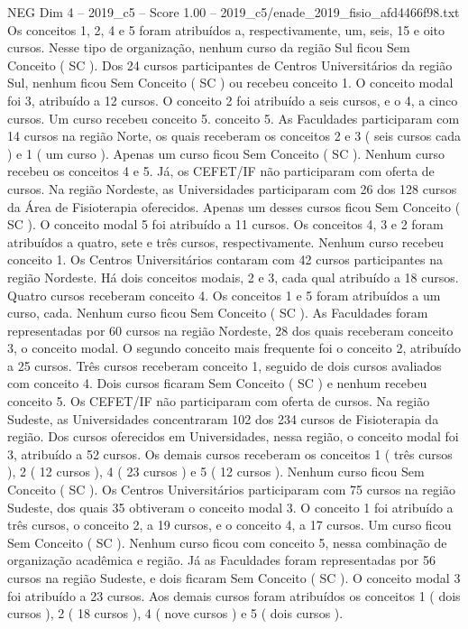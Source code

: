 \begin{textsample}{NEG Dim 4 – 2019\_c5 – Score 1.00 – 2019\_c5/enade\_2019\_fisio\_afd4466f98.txt}
Os conceitos 1, 2, 4 e 5 foram atribuídos a, respectivamente, um, seis, 15 e oito cursos.
Nesse tipo de organização, nenhum curso da região Sul ficou Sem Conceito ( SC ).
Dos 24 cursos participantes de Centros Universitários da região Sul, nenhum ficou Sem Conceito ( SC ) ou recebeu conceito 1.
O conceito modal foi 3, atribuído a 12 cursos.
O conceito 2 foi atribuído a seis cursos, e o 4, a cinco cursos.
Um curso recebeu conceito 5. conceito 5.
As Faculdades participaram com 14 cursos na região Norte, os quais receberam os conceitos 2 e 3 ( seis cursos cada ) e 1 ( um curso ).
Apenas um curso ficou Sem Conceito ( SC ).
Nenhum curso recebeu os conceitos 4 e 5.
Já, os CEFET/IF não participaram com oferta de cursos.
Na região Nordeste, as Universidades participaram com 26 dos 128 cursos da Área de Fisioterapia oferecidos.
Apenas um desses cursos ficou Sem Conceito ( SC ).
O conceito modal 5 foi atribuído a 11 cursos.
Os conceitos 4, 3 e 2 foram atribuídos a quatro, sete e três cursos, respectivamente.
Nenhum curso recebeu conceito 1.
Os Centros Universitários contaram com 42 cursos participantes na região Nordeste.
Há dois conceitos modais, 2 e 3, cada qual atribuído a 18 cursos.
Quatro cursos receberam conceito 4.
Os conceitos 1 e 5 foram atribuídos a um curso, cada.
Nenhum curso ficou Sem Conceito ( SC ).
As Faculdades foram representadas por 60 cursos na região Nordeste, 28 dos quais receberam conceito 3, o conceito modal.
O segundo conceito mais frequente foi o conceito 2, atribuído a 25 cursos.
Três cursos receberam conceito 1, seguido de dois cursos avaliados com conceito 4.
Dois cursos ficaram Sem Conceito ( SC ) e nenhum recebeu conceito 5.
Os CEFET/IF não participaram com oferta de cursos.
Na região Sudeste, as Universidades concentraram 102 dos 234 cursos de Fisioterapia da região.
Dos cursos oferecidos em Universidades, nessa região, o conceito modal foi 3, atribuído a 52 cursos.
Os demais cursos receberam os conceitos 1 ( três cursos ), 2 ( 12 cursos ), 4 ( 23 cursos ) e 5 ( 12 cursos ).
Nenhum curso ficou Sem Conceito ( SC ).
Os Centros Universitários participaram com 75 cursos na região Sudeste, dos quais 35 obtiveram o conceito modal 3.
O conceito 1 foi atribuído a três cursos, o conceito 2, a 19 cursos, e o conceito 4, a 17 cursos.
Um curso ficou Sem Conceito ( SC ).
Nenhum curso ficou com conceito 5, nessa combinação de organização acadêmica e região.
Já as Faculdades foram representadas por 56 cursos na região Sudeste, e dois ficaram Sem Conceito ( SC ).
O conceito modal 3 foi atribuído a 23 cursos.
Aos demais cursos foram atribuídos os conceitos 1 ( dois cursos ), 2 ( 18 cursos ), 4 ( nove cursos ) e 5 ( dois cursos ).

\end{textsample}
